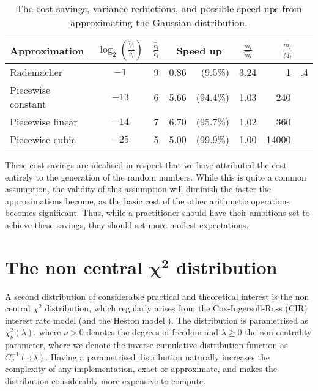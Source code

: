\documentclass[manuscript,review]{acmart}
\begin{document}
\begin{table}[htb]
\centering
\caption{The cost savings, variance reductions, and possible speed ups from approximating the Gaussian distribution.}
\label{tab:savings}
\begin{tabular}{lcclrcr@{}l}
Approximation  & $ {\log}_2 \left(\tfrac{\widetilde{V}_l}{\hat{v}_l}\right) $ & $ \tfrac{\hat{c}_l}{\tilde{c}_l} $ & \multicolumn{2}{c}{Speed up} & $ \tfrac{\widetilde{m}_l}{\widehat{m}_l} $ & \multicolumn{2}{c}{$ \tfrac{\widetilde{m}_l}{\widetilde{M}_l} $} \\[0.5em]
\hline
Rademacher & $ -1 $ & 9 & 0.86 & (9.5\%) & 3.24 & 1&.4 \\
Piecewise constant & $ -13 $ & 6 & 5.66 & (94.4\%) & 1.03 & 240& \\
Piecewise linear  & $ -14 $ & 7& 6.70 & (95.7\%) & 1.02 & 360 &\\
Piecewise cubic  & $ -25 $ & 5 & 5.00 & (99.9\%)& 1.00 & 14000 & 
\end{tabular}
\end{table}

These cost savings are idealised in respect that we have attributed the cost entirely to the generation of the random numbers. While this is quite a common assumption, the validity of this assumption will diminish the faster the approximations become, as the basic cost of the other arithmetic operations becomes significant. Thus, while a practitioner should have their ambitions set to achieve these savings, they should set more modest expectations.

\section{The non central \texorpdfstring{$ \bm{\chi^2} $}{chi-squared} distribution}
\label{sec:the_non_central_chi_squared_distribution}

A second distribution of considerable practical and theoretical interest is the non central $ \chi^2 $ distribution, which regularly arises from the Cox-Ingersoll-Ross (CIR) interest rate model \citep{cox1985theory} (and the Heston model \citep{heston1993closed}). The distribution is parametrised as $ \chi^2_\nu(\lambda) $, where $ \nu > 0 $ denotes the degrees of freedom and $ \lambda \geq 0 $ the non centrality parameter, where we denote the inverse cumulative distribution function as $ C^{-1}_\nu(\cdot; \lambda) $. Having a parametrised distribution naturally increases the complexity of any implementation, exact or approximate, and makes the distribution considerably more expensive to compute. 
\end{document}
